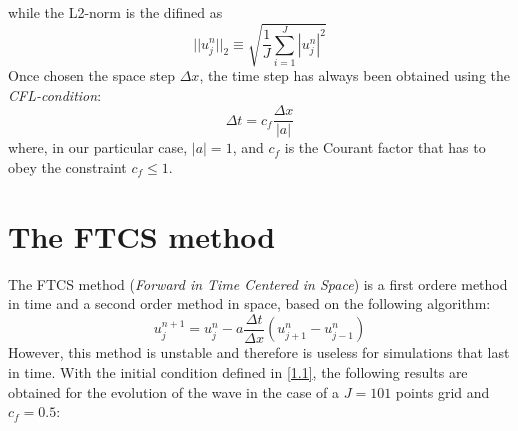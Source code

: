 \documentclass[11pt,a4paper]{article}
\begin{document}
while the L2-norm is the difined as
\begin{equation}
||u^n_j||_2 \equiv \sqrt{\frac{1}{J}\sum_{i=1}^J |u_j^n|^2}
\end{equation}
Once chosen the space step $\Delta x$, the time step has always been obtained using the \emph{CFL-condition}:
\begin{equation}
\Delta t = c_f \frac{\Delta x}{|a|}
\end{equation}
where, in our particular case, $|a|=1$, and $c_f$ is the Courant factor that has to obey the constraint $c_f \leq 1$. 
\section{The FTCS method}
The FTCS method (\emph{Forward in Time Centered in Space}) is a first ordere method in time and a second order method in space, based on the following algorithm:
\begin{equation}
u_j^{n+1} = u_j^n - a\frac{\Delta t}{\Delta x} ( u_{j+1}^n - u_{j-1}^n)
\end{equation}
However, this method is unstable and therefore is useless for simulations that last in time. With the initial condition defined in \eqref{1.1}, the following results are obtained for the evolution of the wave in the case of a $J=101$ points grid and $c_f=0.5$:
\end{document}

